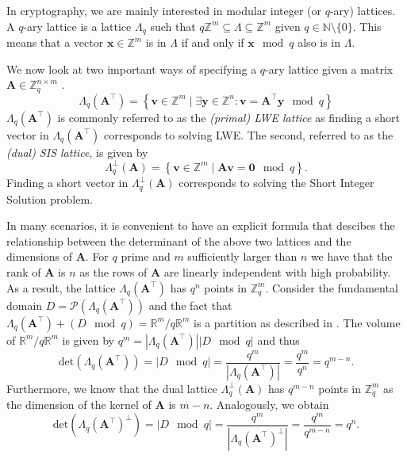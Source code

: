In cryptography, we are mainly interested in modular integer (or $q$-ary) lattices. A $q$-ary lattice is a lattice $\Lambda_q$ such that $q\mathbb{Z}^m \subseteq	\Lambda \subseteq	\mathbb{Z}^m$ given $q \in \mathbb{N}\setminus \{0\}$. This means that a vector $\mathbf{x} \in \mathbb{Z}^m$ is in $\Lambda$ if and only if $\mathbf{x} \mod q$ also is in $\Lambda$.

We now look at two important ways of specifying a $q$-ary lattice given a matrix $\mathbf{A} \in \mathbb{Z}_q^{n\times m}$ \cite{BBGS19}.\begin{equation}\label{eq:lwe-lattice}
    \Lambda_q(\mathbf{A}^\intercal) = \left\{ \mathbf{v} \in \mathbb{Z}^m \mid \exists \mathbf{y} \in \mathbb{Z}^n : \mathbf{v} = \mathbf{A}^\intercal \mathbf{y} \mod q \right\}
\end{equation}
$\Lambda_q(\mathbf{A}^\intercal)$ is commonly referred to as the \textit{(primal) LWE lattice} as finding a short vector in $\Lambda_q(\mathbf{A}^\intercal)$ corresponds to solving LWE. The second, referred to as the \textit{(dual) SIS lattice}, is given by
\begin{equation}\label{eq:sis-lattice}
    \Lambda_q^\perp(\mathbf{A}) = \left\{ \mathbf{v} \in \mathbb{Z}^m \mid  \mathbf{A}\mathbf{v} = \mathbf{0} \mod q \right\}.
\end{equation}
Finding a short vector in $\Lambda_q^\perp(\mathbf{A})$ corresponds to solving the Short Integer Solution problem.


In many scenarios, it is convenient to have an explicit formula that descibes the relationship between the determinant of the above two lattices and the dimensions of $\mathbf{A}$. For $q$ prime and $m$ sufficiently larger than $n$ we have that the rank of $\mathbf{A}$ is $n$ as the rows of $\mathbf{A}$ are linearly independent with high probability. As a result, the lattice $\Lambda_q(\mathbf{A}^\intercal)$ has $q^n$ points in $\mathbb{Z}_q^m$.
Consider the fundamental domain $D = \mathcal{P}(\Lambda_q(\mathbf{A}^\intercal))$ and the fact that $\Lambda_q(\mathbf{A}^\intercal) + (D \mod q) = \mathbb{R}^m/q\mathbb{R}^m$ is a partition as described in \cite{volume-lattice}. The volume of $\mathbb{R}^m/q\mathbb{R}^m$ is given by $q^m =|\Lambda_q(\mathbf{A}^\intercal)||D \mod q|$ and thus
\begin{equation}\label{eq:det-MR}
    \text{det}(\Lambda_q(\mathbf{A}^\intercal)) = |D \mod q| = \frac{q^m}{|\Lambda_q(\mathbf{A}^\intercal)|} = \frac{q^{m}}{q^{n}} = q^{m-n}.
\end{equation}
Furthermore, we know that the dual lattice  $\Lambda_q^\perp(\mathbf{A})$ has $q^{m-n}$ points in $\mathbb{Z}_q^m$ as the dimension of the kernel of $\mathbf{A}$ is $m-n$. Analogously, we obtain
\begin{equation}\label{eq:det-MR-dual}
    \text{det}(\Lambda_q(\mathbf{A}^\intercal)^{\perp}) = |D \mod q| = \frac{q^m}{|\Lambda_q(\mathbf{A}^\intercal)^{\perp}|} = \frac{q^{m}}{q^{m-n}} = q^n.
\end{equation}


